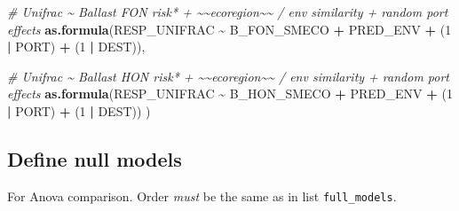 \documentclass[
]{article}
\newenvironment{Shaded}{\begin{snugshade}}{\end{snugshade}}
\newcommand{\CommentTok}[1]{\textcolor[rgb]{0.56,0.35,0.01}{\textit{#1}}}
\newcommand{\DecValTok}[1]{\textcolor[rgb]{0.00,0.00,0.81}{#1}}
\newcommand{\KeywordTok}[1]{\textcolor[rgb]{0.13,0.29,0.53}{\textbf{#1}}}
\newcommand{\NormalTok}[1]{#1}
\newcommand{\OperatorTok}[1]{\textcolor[rgb]{0.81,0.36,0.00}{\textbf{#1}}}
\newcommand{\StringTok}[1]{\textcolor[rgb]{0.31,0.60,0.02}{#1}}
\begin{document}
\begin{Shaded}
\begin{Highlighting}[]
  \CommentTok{\# Unifrac \textasciitilde{} Ballast FON risk* + \textasciitilde{}\textasciitilde{}ecoregion\textasciitilde{}\textasciitilde{} / env similarity + random port effects}
  \KeywordTok{as.formula}\NormalTok{(RESP\_UNIFRAC }\OperatorTok{\textasciitilde{}}\StringTok{ }\NormalTok{B\_FON\_SMECO }\OperatorTok{+}\StringTok{ }\NormalTok{PRED\_ENV }\OperatorTok{+}\StringTok{ }\NormalTok{(}\DecValTok{1} \OperatorTok{|}\StringTok{ }\NormalTok{PORT) }\OperatorTok{+}\StringTok{ }\NormalTok{(}\DecValTok{1} \OperatorTok{|}\StringTok{ }\NormalTok{DEST)),}

  \CommentTok{\# Unifrac \textasciitilde{} Ballast HON risk* + \textasciitilde{}\textasciitilde{}ecoregion\textasciitilde{}\textasciitilde{} / env similarity + random port effects}
  \KeywordTok{as.formula}\NormalTok{(RESP\_UNIFRAC }\OperatorTok{\textasciitilde{}}\StringTok{ }\NormalTok{B\_HON\_SMECO }\OperatorTok{+}\StringTok{ }\NormalTok{PRED\_ENV }\OperatorTok{+}\StringTok{ }\NormalTok{(}\DecValTok{1} \OperatorTok{|}\StringTok{ }\NormalTok{PORT) }\OperatorTok{+}\StringTok{ }\NormalTok{(}\DecValTok{1} \OperatorTok{|}\StringTok{ }\NormalTok{DEST))}
\NormalTok{)}
\end{Highlighting}
\end{Shaded}

\hypertarget{define-null-models}{%
\subsection{Define null models}\label{define-null-models}}

For Anova comparison. Order \emph{must} be the same as in list
\texttt{full\_models}.
\end{document}
